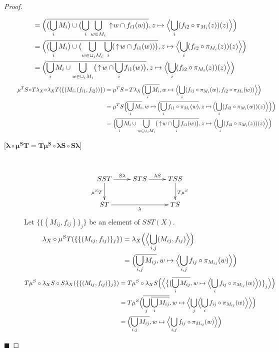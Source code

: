 \begin{proof}
\begin{description}
\begin{align*}
&= \Bigl(\overline{\bigl(\bigcup_i M_i\bigr)\cup \bigl(\bigcup_i \bigcup_{w\in M_i} \,\uparrow\! w \cap f_{i1}(w)\bigr)}, z\mapsto\Bigl\langle\bigcup_i (f_{i2}\circ \pi_{M_i}(z))(z)\Bigr\rangle\Bigr) \\
&= \Bigl(\overline{\bigl(\bigcup_i M_i\bigr)\cup \bigl(\bigcup_{w\in \cup_i M_i} \bigcup_i (\,\uparrow\! w \cap f_{i1}(w))\bigr)}, z\mapsto\Bigl\langle\bigcup_i (f_{i2}\circ \pi_{M_i}(z))(z)\Bigr\rangle\Bigr) \\
&= \Bigl(\overline{\bigcup_i M_i \cup \bigcup_{w\in \cup_i M_i}\bigl(\,\uparrow\! w \cap \bigcup_i f_{i1}(w)\bigr)}, z\mapsto\Bigl\langle\bigcup_i (f_{i2}\circ \pi_{M_i}(z))(z)\Bigr\rangle\Bigr)
\end{align*}
\begin{align*}
\!\!\!\!\!\!\!\mu^T S\!\circ\! T\lambda_X\!\circ\!\lambda_X T (\{(M_i, (f_{i1}, f_{i2}))\}) &= \mu^T S\circ T\lambda_X\Bigl(\overline{\bigcup_i M_i},w\mapsto\Bigl\langle \bigcup_i (f_{i1}\circ\pi_{M_i}(w), f_{i2}\circ\pi_{M_i}(w))\Bigr\rangle\Bigr) \\
&= \mu^T S \Bigl(\overline{\bigcup_i M_i}, w\mapsto\!\Bigl(\overline{\bigcup_i  f_{i1}\circ\pi_{M_i}(w)}, z\mapsto\! \Bigl\langle \bigcup_i(f_{i2} \circ \pi_{M_i}(w))(z)\Bigr\rangle\Bigr)\Bigr) \\
&= \Bigl(\overline{\bigcup_i M_i \cup \bigcup_{w\in \cup_i M_i}\bigl(\ua w \cap \bigcup_i f_{i1}(w)\bigr)}, z\mapsto\Bigl\langle\bigcup_i (f_{i2}\circ \pi_{M_i}(z))(z)\Bigr\rangle\Bigr)
\end{align*}
\item[{[}$\boldsymbol{\lambda\circ\mu^S T = T\mu^S\circ \lambda S\circ S\lambda}${]}] \hfill \\
\[
\xymatrix{
SST\ar[r]^{S\lambda}\ar[d]_{\mu^S T} & STS\ar[r]^{\lambda S} & TSS\ar[d]^{T\mu^S} \\
ST\ar[rr]_\lambda & & TS
}
\]
Let $\{\{(M_{ij},f_{ij})\}_j\}$ be an element of $SST(X)$.
\begin{align*}
\lambda_X\circ\mu^S T (\{\{(M_{ij},f_{ij})\}_j\}) &= \lambda_X\Bigl(\Bigl\langle \bigcup_{i,j}(M_{ij},f_{ij}) \Bigr\rangle\Bigr) \\
&= \Bigl(\overline{\bigcup_{i,j} M_{ij}}, w\mapsto\Bigl\langle\bigcup_{i,j} f_{ij}\circ \pi_{M_{ij}}(w)\Bigr\rangle\Bigr)
\end{align*}
\begin{align*}
T\mu^S\circ \lambda_X S\circ S\lambda_X (\{\{(M_{ij},f_{ij})\}_j\}) &= T\mu^S\circ \lambda_X S \Bigl(\Bigl\langle\bigl\{\bigl(\overline{\bigcup_i M_{ij}},w\mapsto\Bigl\langle \bigcup_i f_{ij}\circ \pi_{M_{ij}}(w)\Bigr\rangle\bigr)\bigr\}_j\Bigr\rangle\Bigr) \\
&= T\mu^S \Bigl(\overline{\bigcup_j \overline{\bigcup_i M_{ij}}}, w\mapsto\Bigl\langle \bigcup_j\Bigl\langle\bigcup_i f_{ij}\circ \pi_{M_{ij}}(w)\Bigr\rangle\Bigr\rangle\Bigr) \\
&= \Bigl(\overline{\bigcup_{i,j} M_{ij}}, w\mapsto\Bigl\langle\bigcup_{i,j} f_{ij}\circ \pi_{M_{ij}}(w)\Bigr\rangle\Bigr)
\end{align*}
\end{description} \hfill $\blacksquare$
\end{proof}

